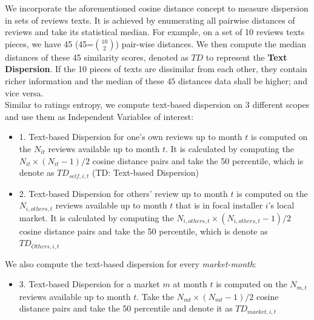 \documentclass[msom,blindrev]{informs3}
\begin{document}
We incorporate the aforementioned cosine distance concept to measure dispersion in sets of reviews texts. It is achieved by enumerating all pairwise distances of reviews and take its statistical median. For example, on a set of 10 reviews texts pieces, we have 45 (45=$\binom{10}{2}$) pair-wise distances.  We then compute the median distances of these 45 similarity scores, denoted as $TD$ to represent the \textbf{Text Dispersion}. If the 10 pieces of texts are dissimilar from each other, they contain richer information and the median of these $45$ distances data shall be higher; and vice versa.  \\
Similar to ratings entropy, we compute text-based dispersion on 3 different scopes and use them as Independent Variables of interest: \\

\begin{itemize}
\item 1. Text-based Dispersion for one's own reviews up to month $t$ is computed on the $N_{it}$ reviews available up to month $t$. It is calculated by computing the $N_{it}\times (N_{it}-1)/2$ cosine distance pairs and take the 50 percentile, which is denote as $TD_{self,i,t}$ (TD: Text-based Dispersion)\\
\item 2. Text-based Dispersion for others' review up to month $t$ is computed on the $N_{i,others,t}$ reviews available up to month $t$ that is in focal installer $i$'s local market. It is calculated by computing the $N_{i,others,t}\times (N_{i,others,t}-1)/2$ cosine distance pairs and take the 50 percentile, which is denote as $TD_{Others,i,t}$ \\
\end{itemize}
We also compute the text-based dispersion for every \textit{market-month}: \\

\begin{itemize}
\item 3. Text-based Dispersion for a market $m$ at month $t$ is computed on the $N_{m,t}$ reviews available up to month $t$. Take the  $N_{mt}\times (N_{mt}-1)/2$ cosine distance pairs and take the 50 percentile and denote it as $TD_{market,i,t}$ \\
\end{itemize}
\end{document}
